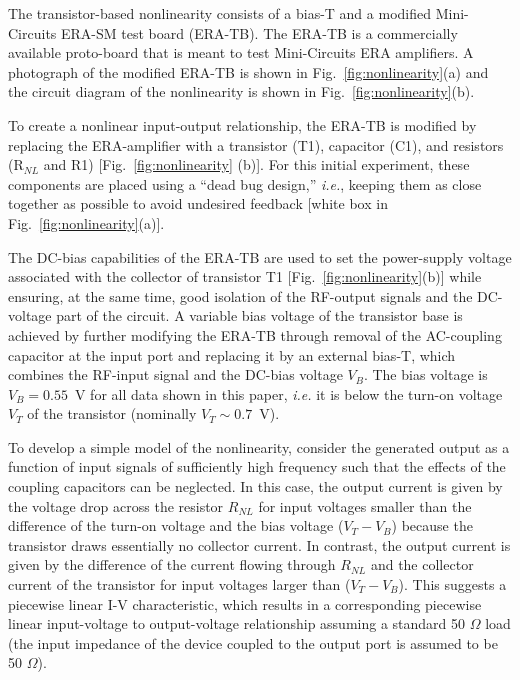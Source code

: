 \documentclass[aps,twocolumn,pre,nofootinbib]{revtex4}
\begin{document}
The transistor-based nonlinearity consists of a bias-T and a modified Mini-Circuits ERA-SM test board (ERA-TB). The ERA-TB is a commercially available proto-board that is meant to test Mini-Circuits ERA amplifiers.  A photograph of the modified ERA-TB is shown in Fig.~\ref{fig:nonlinearity}(a) and  the circuit diagram of the nonlinearity is shown in Fig.~\ref{fig:nonlinearity}(b).


 To create a nonlinear input-output relationship, the ERA-TB is modified by replacing the ERA-amplifier with a transistor (T1), capacitor (C1),  and resistors (R$_{NL}$ and R1) [Fig.~\ref{fig:nonlinearity} (b)]. For this initial experiment, these components are placed using a ``dead bug design,'' {\it i.e.}, keeping them as close together as possible to avoid undesired feedback [white box in Fig.~\ref{fig:nonlinearity}(a)].

 The DC-bias capabilities of the ERA-TB are used to set the power-supply voltage associated with the collector of transistor T1 [Fig.~\ref{fig:nonlinearity}(b)] while ensuring, at the same time, good isolation of the RF-output signals and the DC-voltage part of the circuit.
A variable bias voltage of the transistor base is achieved  by further modifying the ERA-TB through removal of the AC-coupling capacitor at the input port and replacing it by an external bias-T, which combines the RF-input signal and the DC-bias voltage $V_B$.
The bias voltage is $V_B = 0.55$~V for all data shown in this paper, {\it i.e.} it is below the turn-on voltage $V_T$ of the transistor (nominally $V_T \sim 0.7$~V). 

  


To develop a simple model of the nonlinearity, consider the generated output as a function of input signals of sufficiently high frequency such that the effects of the coupling capacitors can be neglected. 
In this case, the output current is given by the voltage drop across the resistor $R_{NL}$ for input voltages smaller than the difference of the turn-on voltage and the bias voltage ($V_T-V_B$) because the transistor draws essentially no collector current.
In contrast, the output current is given by the difference of the current flowing through $R_{NL}$ and the collector current of the transistor for input voltages larger than ($V_T-V_B$). This suggests a piecewise linear I-V characteristic, which results in a corresponding piecewise linear input-voltage to output-voltage relationship assuming a standard 50 $\Omega$ load (the input impedance of the device coupled to the output port is assumed to be 50 $\Omega$).  
\end{document}
